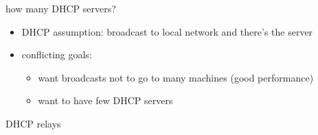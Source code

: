 \begin{frame}{how many DHCP servers?}
    \begin{itemize}
    \item DHCP assumption: broadcast to local network and there's the server
    \vspace{.5cm}
    \item conflicting goals:
        \begin{itemize}
        \item want broadcasts not to go to many machines (good performance)
        \item want to have few DHCP servers
        \end{itemize}
    \end{itemize}
\end{frame}

\begin{frame}{DHCP relays}
\end{frame}
